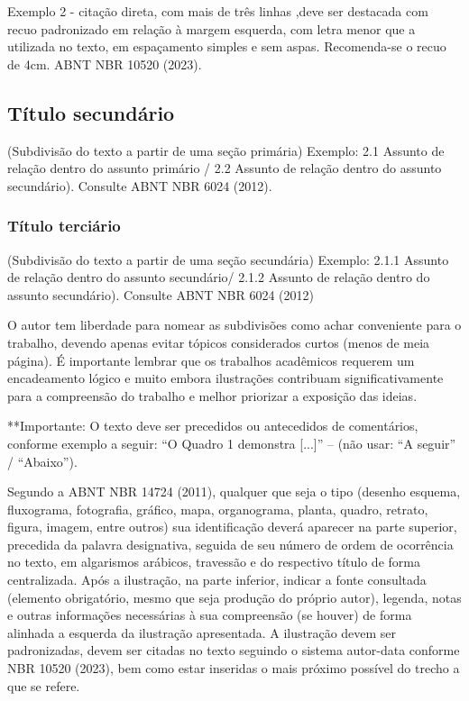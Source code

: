 \documentclass[
article,			%
11pt,				%
twoside,			%
a4paper,			%
section=TITLE,		%
onecolumn,          %
english,			%
brazil,				%
sumario=tradicional
]{abntex2}
\begin{document}
Exemplo 2 -  citação direta, com mais de três linhas ,deve ser destacada com recuo padronizado em relação à margem esquerda, com letra menor que a utilizada no texto, em espaçamento simples e sem aspas. Recomenda-se o recuo de 4cm. ABNT NBR 10520 (2023).
    
    \begin{citacao}
        \lipsum[2]
    \end{citacao}
    
    \lipsum[3]

    
    \subsection{Título secundário}
    
  (Subdivisão do texto a partir de uma seção primária) Exemplo: 2.1 Assunto de relação dentro do assunto primário / 2.2 Assunto de relação dentro do assunto secundário). Consulte ABNT NBR 6024 (2012).

  \subsubsection{Título terciário}
(Subdivisão do texto a partir de uma seção secundária) 
Exemplo: 2.1.1 Assunto de relação dentro do assunto secundário/ 2.1.2 Assunto de relação dentro do assunto secundário). Consulte ABNT NBR 6024 (2012)

O autor tem liberdade para nomear as subdivisões como achar conveniente para o trabalho, devendo apenas evitar tópicos considerados curtos (menos de meia página). 
É importante lembrar que os trabalhos acadêmicos requerem um encadeamento lógico e muito embora ilustrações contribuam significativamente para a compreensão do trabalho e melhor priorizar a exposição das ideias.

**Importante: O texto deve ser precedidos ou antecedidos de comentários, conforme exemplo a seguir: “O Quadro 1 demonstra [...]” – (não usar: “A seguir” / “Abaixo”).

Segundo a ABNT NBR 14724 (2011), qualquer que seja o tipo (desenho esquema, fluxograma, fotografia, gráfico, mapa, organograma, planta, quadro, retrato, figura, imagem, entre outros) sua identificação deverá aparecer na parte superior, precedida da palavra designativa, seguida de seu número de ordem de ocorrência no texto, em algarismos arábicos, travessão e do respectivo título de forma centralizada. Após a ilustração, na parte inferior, indicar a fonte consultada (elemento obrigatório, mesmo que seja produção do próprio autor), legenda, notas e outras informações necessárias à sua compreensão (se houver) de forma alinhada a esquerda da ilustração apresentada. A ilustração devem ser padronizadas, devem ser citadas no texto seguindo o sistema autor-data conforme NBR 10520 (2023), bem como estar inseridas o mais próximo possível do trecho a que se refere.
\end{document}
